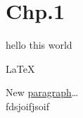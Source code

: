 \documentclass[10pt,twoside,a4paper]{article}
\begin{document}
\section{Chp.1}
    hello this world{} 
    
    \LaTeX
\par New \uline{paragraph}\dots \\
fdsjoi\-fjsoif
\end{document}
